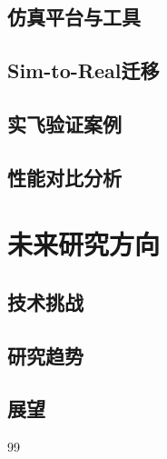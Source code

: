 \documentclass[12pt,a4paper]{ctexart}
\begin{document}
\subsection{仿真平台与工具}
\subsection{Sim-to-Real迁移}
\subsection{实飞验证案例}
\subsection{性能对比分析}

\section{未来研究方向}
\subsection{技术挑战}
\subsection{研究趋势}
\subsection{展望}

\begin{thebibliography}{99}
\end{thebibliography}
\end{document}
